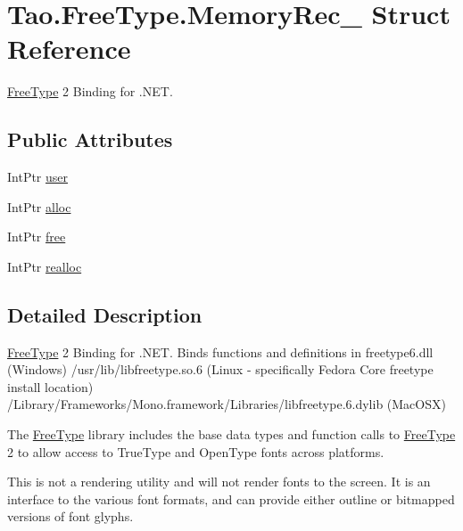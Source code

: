 \hypertarget{struct_tao_1_1_free_type_1_1_memory_rec__}{
\section{Tao.FreeType.MemoryRec\_\- Struct Reference}
\label{struct_tao_1_1_free_type_1_1_memory_rec__}
}


\hyperlink{namespace_tao_1_1_free_type}{FreeType} 2 Binding for .NET.  


\subsection*{Public Attributes}
\begin{DoxyCompactItemize}
\item 
IntPtr \hyperlink{struct_tao_1_1_free_type_1_1_memory_rec___a63dc41e50dda1d32e020b42af1a74062}{user}
\item 
IntPtr \hyperlink{struct_tao_1_1_free_type_1_1_memory_rec___a95c6689303b5b2933a9aa75270d02f6f}{alloc}
\item 
IntPtr \hyperlink{struct_tao_1_1_free_type_1_1_memory_rec___a40a998b40bcf18a35fdc8581f2fb981c}{free}
\item 
IntPtr \hyperlink{struct_tao_1_1_free_type_1_1_memory_rec___a19109acbb86f519f31a5ce08bac4796e}{realloc}
\end{DoxyCompactItemize}


\subsection{Detailed Description}
\hyperlink{namespace_tao_1_1_free_type}{FreeType} 2 Binding for .NET. Binds functions and definitions in freetype6.dll (Windows) /usr/lib/libfreetype.so.6 (Linux -\/ specifically Fedora Core freetype install location) /Library/Frameworks/Mono.framework/Libraries/libfreetype.6.dylib (MacOSX) 

The \hyperlink{namespace_tao_1_1_free_type}{FreeType} library includes the base data types and function calls to \hyperlink{namespace_tao_1_1_free_type}{FreeType} 2 to allow access to TrueType and OpenType fonts across platforms. 

This is not a rendering utility and will not render fonts to the screen. It is an interface to the various font formats, and can provide either outline or bitmapped versions of font glyphs. 

